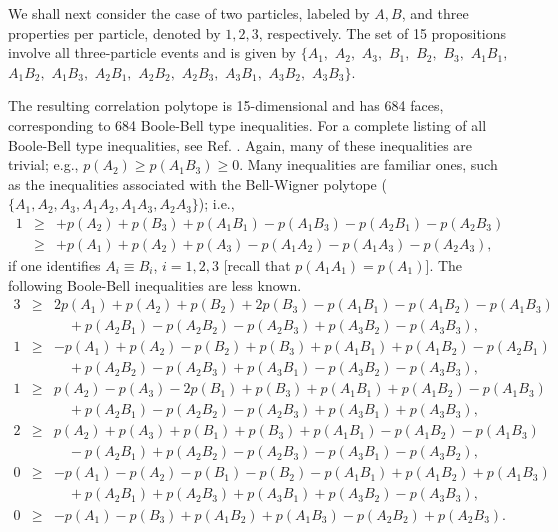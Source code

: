We shall next consider the case of two particles, labeled by
$A,B$,
and three properties per particle, denoted by $1,2,3$, respectively.
The set of 15 propositions involve all three-particle events and is given by
$\{
 A_1        ,$ $
 A_2        ,$ $
 A_3        ,$ $
 B_1        ,$ $
 B_2        ,$ $
 B_3        ,$ $
 A_1B_1     ,$ $
 A_1B_2     ,$ $
 A_1B_3     ,$ $
 A_2B_1     ,$ $
 A_2B_2     ,$ $
 A_2B_3     ,$ $
 A_3B_1     ,$ $
 A_3B_2     ,$ $
 A_3B_3
\}$.

The resulting correlation polytope is 15-dimensional and has 684 faces,
corresponding to 684 Boole-Bell type inequalities.
For a complete listing of all Boole-Bell type inequalities, see Ref. \cite{pit-svo-list2}.
Again, many of these inequalities are trivial; e.g.,   $p(A_2) \ge p(A_1B_3)  \ge  0$.
Many inequalities are   familiar ones,
such as the inequalities associated with the Bell-Wigner polytope
($\{A_1,A_2,A_3,A_1A_2,A_1A_3,A_2A_3\}$); i.e.,
\begin{eqnarray}
1 &\ge&  + p(A_2) + p(B_3) + p(A_1B_1) - p(A_1B_3) - p(A_2B_1) - p(A_2B_3)\label{e3-3bw}\\
  &\ge&  + p(A_1) + p(A_2) + p(A_3) - p(A_1A_2) - p(A_1A_3)  - p(A_2A_3),\nonumber
\end{eqnarray}
if one identifies $A_i\equiv B_i$, $i=1,2,3$
[recall that $p(A_1A_1)=p(A_1)$].
The following Boole-Bell inequalities are less known.
\begin{eqnarray}
3 & \ge & 2p(A_1) + p(A_2) +p(B_2) +2p(B_3) - p(A_1B_1) - p(A_1B_2) - p(A_1B_3)
\nonumber\\ &&\quad
 + p(A_2B_1) - p(A_2B_2) - p(A_2B_3) + p(A_3B_2) - p(A_3B_3)
,\\
1 & \ge & - p(A_1) + p(A_2) -p(B_2) +p(B_3) + p(A_1B_1) + p(A_1B_2) - p(A_2B_1)
\nonumber\\ &&\quad
 + p(A_2B_2) - p(A_2B_3) + p(A_3B_1) - p(A_3B_2) - p(A_3B_3)
,\\
1 & \ge &  p(A_2) - p(A_3) -2p(B_1) +p(B_3) + p(A_1B_1) + p(A_1B_2) - p(A_1B_3)
\nonumber\\ &&\quad
+ p(A_2B_1) - p(A_2B_2) - p(A_2B_3) + p(A_3B_1) + p(A_3B_3)
,\\
2 & \ge &  p(A_2) + p(A_3) + p(B_1) + p(B_3) + p(A_1B_1) - p(A_1B_2) - p(A_1B_3)
\nonumber\\ &&\quad
- p(A_2B_1) + p(A_2B_2) - p(A_2B_3) - p(A_3B_1) - p(A_3B_2)
,       \label{e3-3c}\\
0 & \ge & - p(A_1) - p(A_2) -p(B_1) -p(B_2) - p(A_1B_1) + p(A_1B_2) + p(A_1B_3)
\nonumber\\ &&\quad
 + p(A_2B_1) + p(A_2B_3) + p(A_3B_1) + p(A_3B_2) - p(A_3B_3)
,\label{e3-3a}\\
0 & \ge & - p(A_1) -p(B_3) + p(A_1B_2) + p(A_1B_3) - p(A_2B_2) + p(A_2B_3)
.       \label{e3-3b}
\end{eqnarray}


